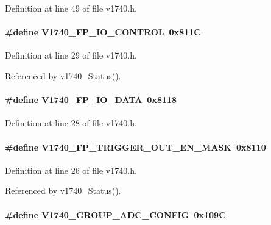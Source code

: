 Definition at line 49 of file v1740.h.
\paragraph[{V1740\_\-FP\_\-IO\_\-CONTROL}]{\setlength{\rightskip}{0pt plus 5cm}\#define V1740\_\-FP\_\-IO\_\-CONTROL~0x811C}\hfill\label{v1740_8h_af20116732dffe79d6be8f36617f0dbe7}


Definition at line 29 of file v1740.h.

Referenced by v1740\_\-Status().
\paragraph[{V1740\_\-FP\_\-IO\_\-DATA}]{\setlength{\rightskip}{0pt plus 5cm}\#define V1740\_\-FP\_\-IO\_\-DATA~0x8118}\hfill\label{v1740_8h_a40040cf79086b24204f706ebe068a7af}


Definition at line 28 of file v1740.h.
\paragraph[{V1740\_\-FP\_\-TRIGGER\_\-OUT\_\-EN\_\-MASK}]{\setlength{\rightskip}{0pt plus 5cm}\#define V1740\_\-FP\_\-TRIGGER\_\-OUT\_\-EN\_\-MASK~0x8110}\hfill\label{v1740_8h_a07a7edbc832cb84dc23607bbe38b5e8a}


Definition at line 26 of file v1740.h.

Referenced by v1740\_\-Status().
\paragraph[{V1740\_\-GROUP\_\-ADC\_\-CONFIG}]{\setlength{\rightskip}{0pt plus 5cm}\#define V1740\_\-GROUP\_\-ADC\_\-CONFIG~0x109C}\hfill\label{v1740_8h_ac1d119559dbcc1439f4af95b0069dffb}


